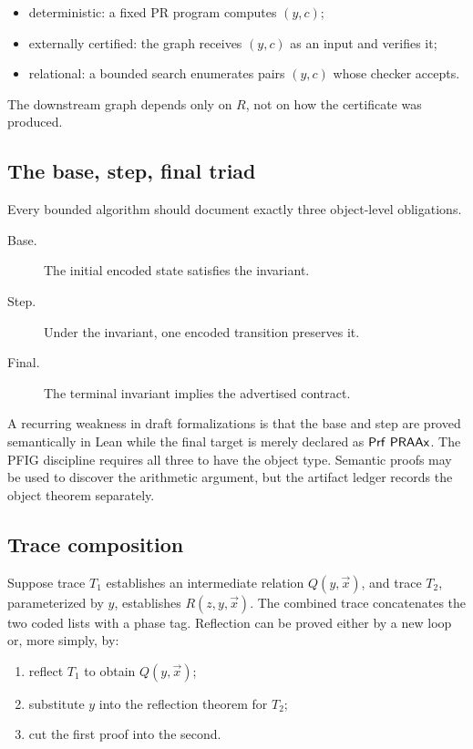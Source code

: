 \begin{itemize}
\item deterministic: a fixed PR program computes \((y,c)\);
\item externally certified: the graph receives \((y,c)\) as an input and verifies it;
\item relational: a bounded search enumerates pairs \((y,c)\) whose checker accepts.
\end{itemize}

The downstream graph depends only on \(R\), not on how the certificate was produced.

\subsection{The base, step, final triad}

Every bounded algorithm should document exactly three object-level obligations.

\begin{description}
\item[Base.] The initial encoded state satisfies the invariant.
\item[Step.] Under the invariant, one encoded transition preserves it.
\item[Final.] The terminal invariant implies the advertised contract.
\end{description}

A recurring weakness in draft formalizations is that the base and step are proved semantically in Lean while the final target is merely declared as \(\mathsf{Prf}\ \mathsf{PRAAx}\).  The PFIG discipline requires all three to have the object type.  Semantic proofs may be used to discover the arithmetic argument, but the artifact ledger records the object theorem separately.

\subsection{Trace composition}

Suppose trace \(T_1\) establishes an intermediate relation \(Q(y,\vec{x})\), and trace \(T_2\), parameterized by \(y\), establishes \(R(z,y,\vec{x})\).  The combined trace concatenates the two coded lists with a phase tag.  Reflection can be proved either by a new loop or, more simply, by:

\begin{enumerate}
\item reflect \(T_1\) to obtain \(Q(y,\vec{x})\);
\item substitute \(y\) into the reflection theorem for \(T_2\);
\item cut the first proof into the second.
\end{enumerate}


